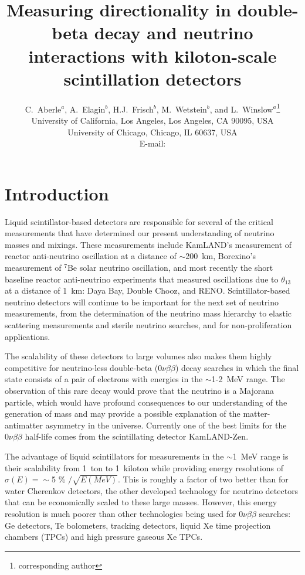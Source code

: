 \documentclass[cits]{JINST}
\title{Measuring directionality in double-beta decay and neutrino interactions with kiloton-scale scintillation detectors}
\author{C.~Aberle$^a$, A.~Elagin$^b$, H.J.~Frisch$^b$, M.~Wetstein$^b$, and L.~Winslow$^a$\setcounter{footnote}{0}\thanks{corresponding author}\\
\llap{$^a$}University of California, Los Angeles, Los Angeles, CA 90095, USA\\
\llap{$^b$}University of Chicago, Chicago, IL 60637, USA\\
  E-mail: \email{lwinslow@physics.ucla.edu}}
\begin{document}
\section{Introduction}
Liquid scintillator-based detectors are responsible for several of the
critical measurements that have determined our present understanding
of neutrino masses and mixings. These measurements include KamLAND's
measurement of reactor anti-neutrino oscillation at a distance of
$\sim$200~km\cite{kam2013}, Borexino's measurement of $^{7}$Be solar
neutrino oscillation\cite{borexino}, and most recently the short
baseline reactor anti-neutrino experiments that measured oscillations
due to $\theta_{13}$ at a distance of 1~km: Daya Bay\cite{dbtwo},
Double Chooz\cite{dctwo, dchydrogen}, and RENO\cite{reno}.
Scintillator-based neutrino detectors will continue to be important for the
next set of neutrino measurements, from the determination of the
neutrino mass hierarchy\cite{juno,reno50} to elastic scattering
measurements\cite{isodarscatt} and sterile neutrino
searches\cite{isodar,nist}, and for non-proliferation
applications\cite{nucifer, songs}.

The scalability of these detectors to large volumes also makes them
highly competitive for neutrino-less double-beta ($0\nu\beta\beta$)
decay searches in which the final state consists of a pair of
electrons with energies in the $\sim$1-2~MeV range.  The observation of this
rare decay would prove that the neutrino is a Majorana particle, which
would have profound consequences to our understanding of the generation of
mass and may provide a possible explanation of the matter-antimatter
asymmetry in the universe\cite{leptogenesis}.  Currently one of the best limits for the
$0\nu\beta\beta$ half-life comes from the scintillating detector
KamLAND-Zen\cite{KZ0nu}.

The advantage of liquid scintillators for measurements in the
$\sim$1~MeV range is their scalability from 1~ton to 1~kiloton while
providing energy resolutions of $\sigma(E)=\sim$5 \% $/\sqrt{E(MeV)}$\cite{kam2013,borexino}. This is roughly a factor of
two better than for water Cherenkov detectors, the other developed
technology for neutrino detectors that can be economically scaled to these large
masses. However, this energy resolution is much poorer than other technologies being used for $0\nu\beta\beta$ searches: Ge detectors\cite{gerda2013}, Te bolometers\cite{Alessandria:2011rc}, tracking detectors\cite{SuperNEMO}, liquid Xe time projection chambers (TPCs)\cite{EXO2012} and high pressure gaseous Xe TPCs\cite{NEXTsipm}.  
\end{document}

